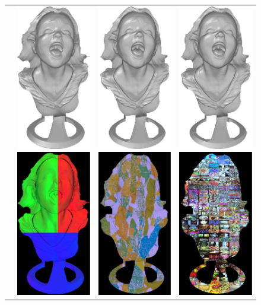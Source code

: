 \begin{figure}[H]
{\begin{tabular}{cccc}
\multirow{-15}{*}{\parbox[t]{2.5mm}{}} &   
 \includegraphics[height=0.25\linewidth]{figures/result/comp_robust_rgb_shape.pdf}
 \includegraphics[height=0.25\linewidth]{figures/result/comp_robust_rgb_albedo.pdf} &
 \includegraphics[height=0.25\linewidth]{figures/result/comp_robust_pattern_shape.pdf} 
\includegraphics[height=0.25\linewidth]{figures/result/comp_robust_pattern_albedo.pdf} &
\includegraphics[height=0.25\linewidth]{figures/result/comp_robust_love_shape.pdf} 
\includegraphics[height=0.25\linewidth]{figures/result/comp_robust_love_albedo.pdf} \\

\end{tabular}}
\end{figure}
